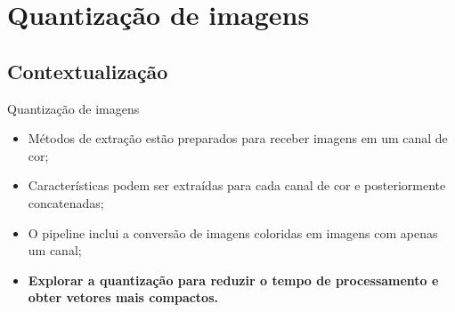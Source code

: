 \documentclass[10pt]{beamer}
\begin{document}
\section{Quantização de imagens}
\subsection{Contextualização}
\begin{frame}{Quantização de imagens}
  \setlength\leftmargini{1em}
  \begin{block}{}
        \begin{itemize}
      \item Métodos de extração estão preparados para receber imagens em um canal de cor;
      \item Características podem ser extraídas para cada canal de cor e posteriormente concatenadas;
      \item O pipeline inclui a conversão de imagens coloridas em imagens com apenas um canal;
      \item \textbf{Explorar a quantização para reduzir o tempo de processamento e obter vetores mais compactos.}
    \end{itemize}
  \end{block}
\end{frame}
\end{document}

